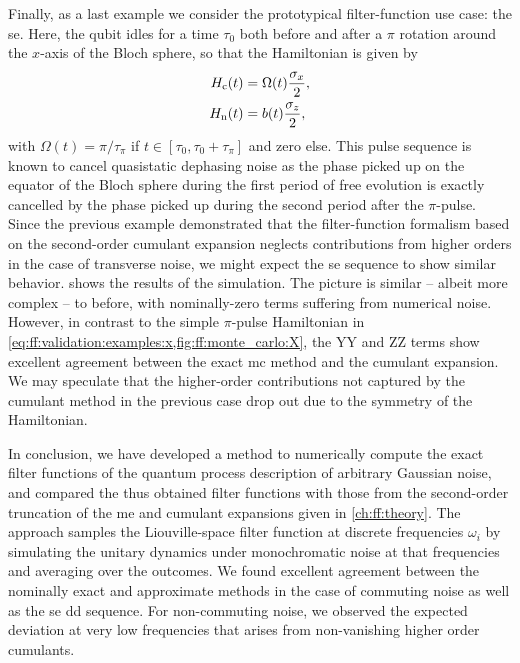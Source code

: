 Finally, as a last example we consider the prototypical filter-function use case: the \acrfull{se}.
Here, the qubit idles for a time $\tau_{0}$ both before and after a $\pi$ rotation around the $x$-axis of the Bloch sphere, so that the Hamiltonian is given by
\begin{equation}\label{eq:ff:validation:examples:se}
    \begin{split}
        H_{\mathrm{c}}(t) &= \Omega(t)\frac{\sigma_x}{2}, \\
        H_{\mathrm{n}}(t) &= b(t)\frac{\sigma_z}{2},
    \end{split}
\end{equation}
with $\Omega(t) = \pi/\tau_\pi$ if $t\in[\tau_0, \tau_0+\tau_\pi]$ and zero else.
This pulse sequence is known to cancel quasistatic dephasing noise as the phase picked up on the equator of the Bloch sphere during the first period of free evolution is exactly cancelled by the phase picked up during the second period after the $\pi$-pulse.
Since the previous example demonstrated that the filter-function formalism based on the second-order cumulant expansion neglects contributions from higher orders in the case of transverse noise, we might expect the \gls{se} sequence to show similar behavior.
 shows the results of the simulation.
The picture is similar -- albeit more complex -- to before, with nominally-zero terms suffering from numerical noise.
However, in contrast to the simple $\pi$-pulse Hamiltonian in \cref{eq:ff:validation:examples:x,fig:ff:monte_carlo:X}, the YY and ZZ terms show excellent agreement between the exact \gls{mc} method and the cumulant expansion.
We may speculate that the higher-order contributions not captured by the cumulant method in the previous case drop out due to the symmetry of the Hamiltonian.

In conclusion, we have developed a method to numerically compute the exact filter functions of the quantum process description of arbitrary Gaussian noise, and compared the thus obtained filter functions with those from the second-order truncation of the \gls{me} and cumulant expansions given in \cref{ch:ff:theory}.
The approach samples the Liouville-space filter function at discrete frequencies $\omega_i$ by simulating the unitary dynamics under monochromatic noise at that frequencies and averaging over the outcomes.
We found excellent agreement between the nominally exact and approximate methods in the case of commuting noise as well as the \gls{se} \gls{dd} sequence.
For non-commuting noise, we observed the expected deviation at very low frequencies that arises from non-vanishing higher order cumulants.

